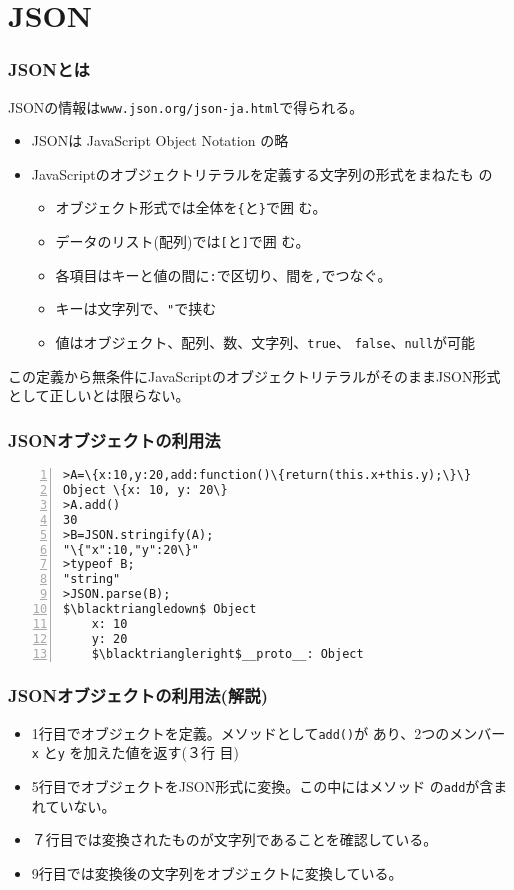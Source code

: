 
\renewcommand{\theFancyVerbLine}{\footnotesize\arabic{FancyVerbLine}}

\frame{\maketitle}
\section{JSON}
\begin{frame}[containsverbatim]
 \frametitle{JSONとは}
 JSONの情報は\texttt{www.json.org/json-ja.html}で得られる。
 \begin{itemize}
  \item  JSONは JavaScript Object Notation の略
  \item JavaScriptのオブジェクトリテラルを定義する文字列の形式をまねたも
				の
				\begin{itemize}
				 \item オブジェクト形式では全体を\texttt{\{}と\texttt{\}}で囲
               む。
         \item データのリスト(配列)では\texttt{[}と\texttt{]}で囲
               む。
				 \item 各項目はキーと値の間に\texttt{:}で区切り、間を\texttt{,}でつなぐ。
				 \item キーは文字列で、\texttt{"}で挟む%
				 \item 値はオブジェクト、配列、数、文字列、\texttt{true}、
							 \texttt{false}、\texttt{null}が可能
				\end{itemize}
 \end{itemize}
 この定義から無条件にJavaScriptのオブジェクトリテラルがそのままJSON形式
 として正しいとは限らない。
\end{frame}
\begin{frame}[containsverbatim]
 \frametitle{JSONオブジェクトの利用法}
\begin{Verbatim}[numbers=left, fontsize=\scriptsize,numbersep=1pt,
	commandchars=\\\{\},
	codes={\catcode`$=3\catcode`^=7}]
>A=\{x:10,y:20,add:function()\{return(this.x+this.y);\}\}
Object \{x: 10, y: 20\}
>A.add()
30
>B=JSON.stringify(A);
"\{"x":10,"y":20\}"
>typeof B;
"string"
>JSON.parse(B);
$\blacktriangledown$ Object
	x: 10
	y: 20
	$\blacktriangleright$__proto__: Object
\end{Verbatim}
\end{frame}
\begin{frame}[containsverbatim]
 \frametitle{JSONオブジェクトの利用法(解説)}
\begin{itemize}
 \item 1行目でオブジェクトを定義。メソッドとして\Verb+add()+が
			 あり、2つのメンバー\Verb+x+ と\Verb+y+ を加えた値を返す(３行
			 目)
 \item 5行目でオブジェクトをJSON形式に変換。この中にはメソッド
			 の\Verb+add+が含まれていない。
 \item ７行目では変換されたものが文字列であることを確認している。
 \item 9行目では変換後の文字列をオブジェクトに変換している。
\end{itemize}
\end{frame}
